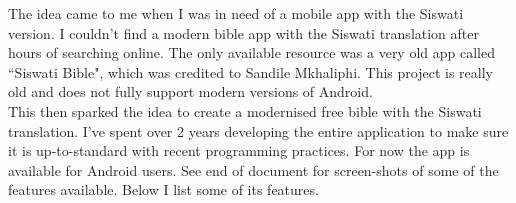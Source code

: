 \documentclass[11pt]{report}
\begin{document}
    The idea came to me when I was in need of a mobile app with the Siswati version.
    I couldn't find a modern bible app with the Siswati translation after hours of searching online.
    The only available resource was a very old app called ``Siswati Bible", which was credited to Sandile Mkhaliphi.
    This project is really old and does not fully support modern versions of Android.\\

    This then sparked the idea to create a modernised free bible with the Siswati translation.
    I've spent over 2 years developing the entire application to make sure it is up-to-standard with recent
    programming practices.
    For now the app is available for Android users.
    See end of document for screen-shots of some of the features available.
    Below I list some of its features.\\
\end{document}
